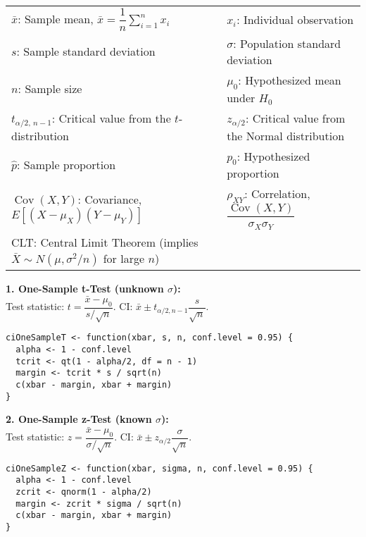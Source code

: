 \documentclass[10pt]{article}
\begin{document}
\noindent
\begin{tabular}{ll}
$\bar{x}$: Sample mean, $\bar{x}=\dfrac{1}{n}\sum_{i=1}^n x_i$ & $x_i$: Individual observation \\[0.5em]
$s$: Sample standard deviation & $\sigma$: Population standard deviation \\[0.5em]
$n$: Sample size & $\mu_0$: Hypothesized mean under $H_0$ \\[0.5em]
$t_{\alpha/2,\,n-1}$: Critical value from the $t$-distribution & $z_{\alpha/2}$: Critical value from the Normal distribution \\[0.5em]
$\hat{p}$: Sample proportion & $p_0$: Hypothesized proportion \\[0.5em]
$\operatorname{Cov}(X,Y)$: Covariance, $E[(X-\mu_X)(Y-\mu_Y)]$ & $\rho_{XY}$: Correlation, $\dfrac{\operatorname{Cov}(X,Y)}{\sigma_X\sigma_Y}$ \\
CLT: Central Limit Theorem (implies $\bar{X}\sim N(\mu,\sigma^2/n)$ for large $n$)\\[1em]
\end{tabular}

\noindent\textbf{1. One-Sample t-Test (unknown $\sigma$):} \\
Test statistic: $t=\dfrac{\bar{x}-\mu_0}{s/\sqrt{n}}$. \quad CI: $\bar{x}\pm t_{\alpha/2,n-1}\dfrac{s}{\sqrt{n}}$. 

 

 
\begin{lstlisting}
ciOneSampleT <- function(xbar, s, n, conf.level = 0.95) {
  alpha <- 1 - conf.level
  tcrit <- qt(1 - alpha/2, df = n - 1)
  margin <- tcrit * s / sqrt(n)
  c(xbar - margin, xbar + margin)
}
\end{lstlisting}

 

\noindent\textbf{2. One-Sample z-Test (known $\sigma$):} \\
Test statistic: $z=\dfrac{\bar{x}-\mu_0}{\sigma/\sqrt{n}}$. \quad CI: $\bar{x}\pm z_{\alpha/2}\dfrac{\sigma}{\sqrt{n}}$.

 

 
\begin{lstlisting}
ciOneSampleZ <- function(xbar, sigma, n, conf.level = 0.95) {
  alpha <- 1 - conf.level
  zcrit <- qnorm(1 - alpha/2)
  margin <- zcrit * sigma / sqrt(n)
  c(xbar - margin, xbar + margin)
}
\end{lstlisting}

 
\end{document}
